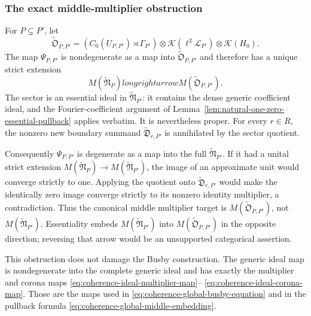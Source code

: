 \subsubsection{The exact middle-multiplier obstruction}

For $P\subsetneq P'$, let
\begin{equation}
 \widetilde{\mathfrak O}_{P,P'}=
 (C_0(U_{P,P'})\rtimes\Gamma_{P'})
 \otimes\mathcal K(\ell^2\mathcal L_{P'})\otimes\mathcal K(H_0).
 \label{eq:coherence-old-sector-ideal}
\end{equation}
The map $\Psi_{P,P'}$ is nondegenerate as a map into
$\widetilde{\mathfrak O}_{P,P'}$ and therefore has a unique strict extension
\begin{equation}
 M(\widetilde{\mathfrak N}_P)longrightarrow
 M(\widetilde{\mathfrak O}_{P,P'}).
 \label{eq:coherence-sector-multiplier-map}
\end{equation}
The sector is an essential ideal in
$\widetilde{\mathfrak N}_{P'}$: it contains the dense generic coefficient
ideal, and the Fourier-coefficient argument of
Lemma~\ref{lem:natural-one-zero-essential-pullback} applies verbatim.
It is nevertheless proper.  For every $r\in R$, the nonzero new boundary
summand $\widetilde{\mathfrak D}_{r,P'}$ is annihilated by the sector quotient.

Consequently $\Psi_{P,P'}$ is degenerate as a map into the full
$\widetilde{\mathfrak N}_{P'}$.  If it had a unital strict extension
$M(\widetilde{\mathfrak N}_P)\to M(\widetilde{\mathfrak N}_{P'})$, the image
of an approximate unit would converge strictly to one.  Applying the quotient
onto $\widetilde{\mathfrak D}_{r,P'}$ would make the identically zero image
converge strictly to its nonzero identity multiplier, a contradiction.
Thus the canonical middle multiplier target is
$M(\widetilde{\mathfrak O}_{P,P'})$, not
$M(\widetilde{\mathfrak N}_{P'})$.  Essentiality embeds
$M(\widetilde{\mathfrak N}_{P'})$ into
$M(\widetilde{\mathfrak O}_{P,P'})$ in the opposite direction; reversing
that arrow would be an unsupported categorical assertion.

This obstruction does not damage the Busby construction.  The generic ideal
map is nondegenerate into the complete generic ideal and has exactly the
multiplier and corona maps
\eqref{eq:coherence-ideal-multiplier-map}--
\eqref{eq:coherence-ideal-corona-map}.  Those are the maps used in
\eqref{eq:coherence-global-busby-equation} and in the pullback formula
\eqref{eq:coherence-global-middle-embedding}.

